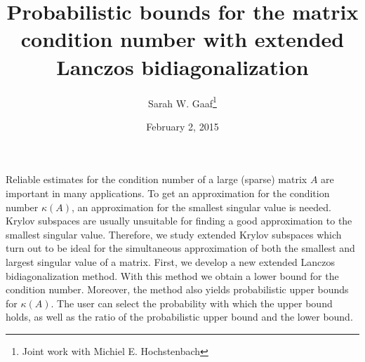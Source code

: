 \documentclass{article}
\title{Probabilistic bounds for the matrix condition number with extended Lanczos bidiagonalization}
\author{Sarah W. Gaaf\thanks{Joint work with Michiel E. Hochstenbach}}
\affil{PhD student at Eindhoven University of Technology}
\date{February 2, 2015}
\begin{document}
\maketitle
Reliable estimates for the condition number of a large (sparse) matrix $A$ are important in many applications.
To get an approximation for the condition number $\kappa(A)$, an approximation for the smallest
singular value is needed. Krylov subspaces are usually unsuitable for finding a good approximation
to the smallest singular value.
Therefore, we study extended Krylov subspaces which turn out to be ideal for the simultaneous
approximation of both the smallest and largest singular value of a matrix.
First, we develop a new extended Lanczos bidiagonalization method.
With this method we obtain a lower bound for the condition number.
Moreover, the method also yields probabilistic upper bounds for $\kappa(A)$.
The user can select the probability with which the upper bound holds,
as well as the ratio of the probabilistic upper bound and the lower bound.
\end{document}
